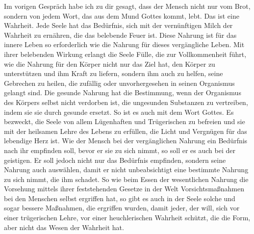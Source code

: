 Im vorigen Gespräch habe ich zu dir gesagt, dass der Mensch nicht nur vom Brot, sondern von jedem Wort, das aus dem Mund Gottes kommt, lebt. Das ist eine Wahrheit. Jede Seele hat das Bedürfnis, sich mit der vernünftigen Milch der Wahrheit zu ernähren, die das belebende Feuer ist. Diese Nahrung ist für das innere Leben so erforderlich wie die Nahrung für dieses vergängliche Leben. Mit ihrer belebenden Wirkung erlangt die Seele Fülle, die zur Vollkommenheit führt, wie die Nahrung für den Körper nicht nur das Ziel hat, den Körper zu unterstützen und ihm Kraft zu liefern, sondern ihm auch zu helfen, seine Gebrechen zu heilen, die zufällig oder unvorhergesehen in seinen Organismus gelangt sind. Die gesunde Nahrung hat die Bestimmung, wenn der Organismus des Körpers selbst nicht verdorben ist, die ungesunden Substanzen zu vertreiben, indem sie sie durch gesunde ersetzt. So ist es auch mit dem Wort Gottes. Es bezweckt, die Seele von allem Lügenhaften und Trügerischen zu befreien und sie mit der heilsamen Lehre des Lebens zu erfüllen, die Licht und Vergnügen für das lebendige Herz ist. Wie der Mensch bei der vergänglichen Nahrung ein Bedürfnis nach ihr empfinden soll, bevor er sie zu sich nimmt, so soll er es auch bei der geistigen. Er soll jedoch nicht nur das Bedürfnis empfinden, sondern seine Nahrung auch auswählen, damit er nicht unbeabsichtigt eine bestimmte Nahrung zu sich nimmt, die ihm schadet. So wie beim Essen der wesentlichen Nahrung die Vorsehung mittels ihrer feststehenden Gesetze in der Welt Vorsichtsmaßnahmen bei den Menschen selbst ergriffen hat, so gibt es auch in der Seele solche und sogar bessere Maßnahmen, die ergriffen wurden, damit jeder, der will, sich vor einer trügerischen Lehre, vor einer heuchlerischen Wahrheit schützt, die die Form, aber nicht das Wesen der Wahrheit hat. 

